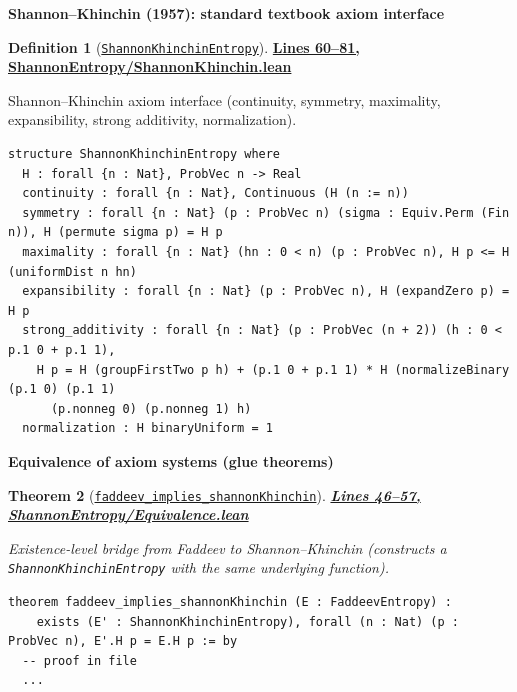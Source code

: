 \documentclass[11pt]{article}
\newtheorem{theorem}{Theorem}[section]
\theoremstyle{definition}
\newtheorem{definition}[theorem]{Definition}
\theoremstyle{remark}
\begin{document}
\textbf{Shannon--Khinchin (1957): standard textbook axiom interface}

\begin{definition}[\href{https://github.com/zariuq/ks-foundations-of-inference/blob/main/InformationTheory/ShannonEntropy/ShannonKhinchin.lean\#L60}{\texttt{ShannonKhinchinEntropy}}]
\textbf{\href{https://github.com/zariuq/ks-foundations-of-inference/blob/main/InformationTheory/ShannonEntropy/ShannonKhinchin.lean\#L60-L81}{Lines 60--81, ShannonEntropy/ShannonKhinchin.lean}}

Shannon--Khinchin axiom interface (continuity, symmetry, maximality, expansibility, strong additivity, normalization).
\end{definition}

\begin{lstlisting}[caption={Shannon--Khinchin axiom interface}]
structure ShannonKhinchinEntropy where
  H : forall {n : Nat}, ProbVec n -> Real
  continuity : forall {n : Nat}, Continuous (H (n := n))
  symmetry : forall {n : Nat} (p : ProbVec n) (sigma : Equiv.Perm (Fin n)), H (permute sigma p) = H p
  maximality : forall {n : Nat} (hn : 0 < n) (p : ProbVec n), H p <= H (uniformDist n hn)
  expansibility : forall {n : Nat} (p : ProbVec n), H (expandZero p) = H p
  strong_additivity : forall {n : Nat} (p : ProbVec (n + 2)) (h : 0 < p.1 0 + p.1 1),
    H p = H (groupFirstTwo p h) + (p.1 0 + p.1 1) * H (normalizeBinary (p.1 0) (p.1 1)
      (p.nonneg 0) (p.nonneg 1) h)
  normalization : H binaryUniform = 1
\end{lstlisting}

\textbf{Equivalence of axiom systems (glue theorems)}

\begin{theorem}[\href{https://github.com/zariuq/ks-foundations-of-inference/blob/main/InformationTheory/ShannonEntropy/Equivalence.lean\#L46}{\texttt{faddeev\_implies\_shannonKhinchin}}]
\textbf{\href{https://github.com/zariuq/ks-foundations-of-inference/blob/main/InformationTheory/ShannonEntropy/Equivalence.lean\#L46-L57}{Lines 46--57, ShannonEntropy/Equivalence.lean}}

Existence-level bridge from Faddeev to Shannon--Khinchin (constructs a \texttt{ShannonKhinchinEntropy}
with the same underlying function).
\end{theorem}

\begin{lstlisting}[caption={Faddeev -> Shannon--Khinchin bridge}]
theorem faddeev_implies_shannonKhinchin (E : FaddeevEntropy) :
    exists (E' : ShannonKhinchinEntropy), forall (n : Nat) (p : ProbVec n), E'.H p = E.H p := by
  -- proof in file
  ...
\end{lstlisting}
\end{document}
